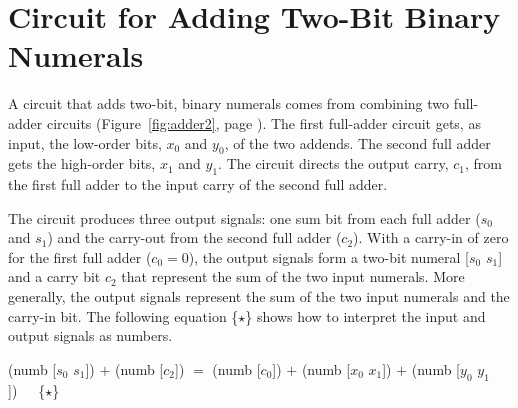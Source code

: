 \section{Circuit for Adding Two-Bit Binary Numerals}
\label{sec:adding-2-bit-numerals}

A circuit that adds two-bit, binary numerals
comes from combining two full-adder circuits
(Figure~\ref{fig:adder2}, page \pageref{fig:adder2}).
The first full-adder circuit gets, as input, the
low-order bits, $x_0$ and $y_0$,  of the two addends. 
The second full adder gets the high-order bits,
$x_1$ and $y_1$. 
The circuit directs the output carry, $c_1$, from 
the first full adder to the input carry of the 
second full adder.

The circuit produces three output signals: one sum bit from
each full adder ($s_0$ and $s_1$) and the carry-out 
from the second full adder ($c_2$).
With a carry-in of zero for the first full adder
($c_0 = 0$), the output signals form a two-bit
numeral \textsf{[$s_0$ $s_1$]} and a carry bit $c_2$
that represent the sum of the two input numerals.
More generally, the output signals 
represent the sum of the two input numerals and the
carry-in bit.
The following equation \{$\star$\} shows how to interpret the
input and output signals as numbers.

\begin{center}
\textsf{(numb [$s_0$ $s_1$]) $+$ (numb [$c_2$])} $=$ 
\textsf{(numb [$c_0$]) $+$ (numb [$x_0$ $x_1$]) $+$ (numb [$y_0$ $y_1$])}~~~\{$\star$\}
\end{center}

